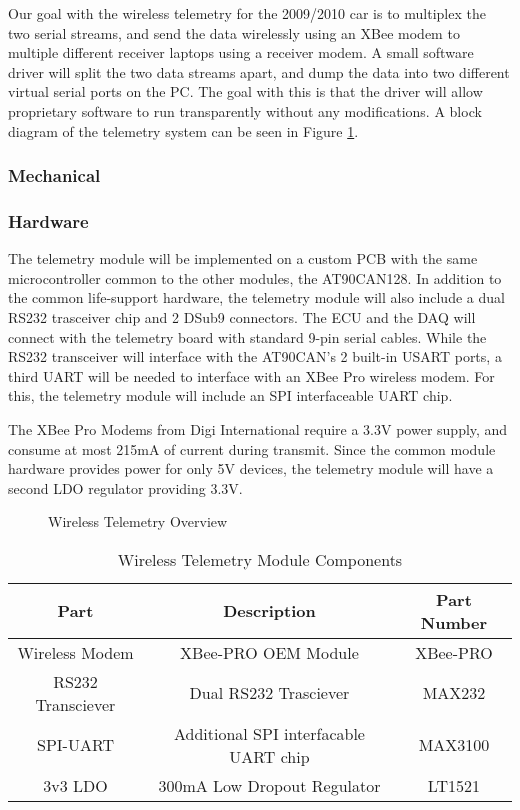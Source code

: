 Our goal with the wireless telemetry for the 2009/2010 car is to multiplex
the two serial streams, and send the data wirelessly using an XBee
modem to multiple different receiver laptops using a receiver modem.
A small software driver will split the two data streams apart, and
dump the data into two different virtual serial ports on the PC. The
goal with this is that the driver will allow proprietary software
to run transparently without any modifications. A block diagram of
the telemetry system can be seen in Figure
\ref{fig:Wireless-Telemetry-Overview}.

\subsubsection{Mechanical}
\subsubsection{Hardware}
The telemetry module will be implemented on a custom PCB with the same
microcontroller common to the other modules, the AT90CAN128. In addition to the
common life-support hardware, the telemetry module will also include a dual
RS232 trasceiver chip and 2 DSub9 connectors. The ECU and the DAQ will connect
with the telemetry board with standard 9-pin serial cables. While the RS232
transceiver will interface with the AT90CAN's 2 built-in USART ports, a third
UART will be needed to interface with an XBee Pro wireless modem. For this, the
telemetry module will include an SPI interfaceable UART chip.

The XBee Pro Modems from Digi International require a 3.3V power supply, and
consume at most 215mA of current during transmit. Since the common module
hardware provides power for only 5V devices,
the telemetry module will have a second LDO regulator providing 3.3V.

  \begin{figure}[H]
    \begin{centering}
      
    \end{centering}

    \caption{Wireless Telemetry Overview\label{fig:Wireless-Telemetry-Overview}}
  \end{figure}

  \begin{table}[H]
    \caption{Wireless Telemetry Module
Components\label{tab:Wireless-Telemetry-Module}}
    \begin{centering}
      \begin{tabular}{|c|c|c|}
	\hline 
	Part & Description & Part Number\tabularnewline
	\hline
	\hline
	Wireless Modem & XBee-PRO OEM Module & XBee-PRO\tabularnewline
	\hline 
	RS232 Transciever & Dual RS232 Trasciever & MAX232\tabularnewline
	\hline 
	SPI-UART & Additional SPI interfacable UART chip &
MAX3100\tabularnewline
	\hline 
	3v3 LDO & 300mA Low Dropout Regulator & LT1521\tabularnewline
	\hline
      \end{tabular}
    \end{centering}
  \end{table}

